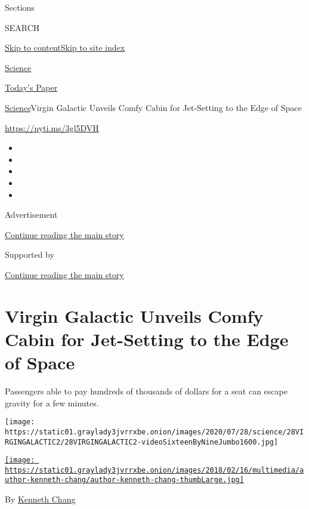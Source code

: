 Sections

SEARCH

\protect\hyperlink{site-content}{Skip to
content}\protect\hyperlink{site-index}{Skip to site index}

\href{https://www.nytimes3xbfgragh.onion/section/science}{Science}

\href{https://myaccount.nytimes3xbfgragh.onion/auth/login?response_type=cookie\&client_id=vi}{}

\href{https://www.nytimes3xbfgragh.onion/section/todayspaper}{Today's
Paper}

\href{/section/science}{Science}\textbar{}Virgin Galactic Unveils Comfy
Cabin for Jet-Setting to the Edge of Space

\url{https://nyti.ms/3gl5DVH}

\begin{itemize}
\item
\item
\item
\item
\item
\end{itemize}

Advertisement

\protect\hyperlink{after-top}{Continue reading the main story}

Supported by

\protect\hyperlink{after-sponsor}{Continue reading the main story}

\hypertarget{virgin-galactic-unveils-comfy-cabin-for-jet-setting-to-the-edge-of-space}{%
\section{Virgin Galactic Unveils Comfy Cabin for Jet-Setting to the Edge
of
Space}\label{virgin-galactic-unveils-comfy-cabin-for-jet-setting-to-the-edge-of-space}}

Passengers able to pay hundreds of thousands of dollars for a seat can
escape gravity for a few minutes.

\texttt{[image: https://static01.graylady3jvrrxbe.onion/images/2020/07/28/science/28VIRGINGALACTIC2/28VIRGINGALACTIC2-videoSixteenByNineJumbo1600.jpg]}

\href{https://www.nytimes3xbfgragh.onion/by/kenneth-chang}{\texttt{[image: https://static01.graylady3jvrrxbe.onion/images/2018/02/16/multimedia/author-kenneth-chang/author-kenneth-chang-thumbLarge.jpg]}}

By \href{https://www.nytimes3xbfgragh.onion/by/kenneth-chang}{Kenneth
Chang}

